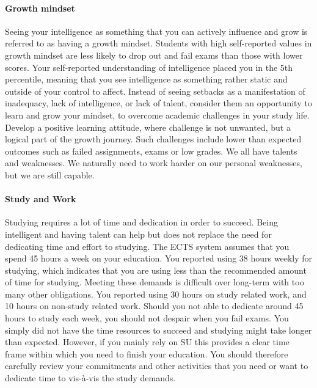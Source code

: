 \documentclass[]{article}
\let\oldparagraph\paragraph
\renewcommand{\paragraph}[1]{\oldparagraph{#1}\mbox{}}
\begin{document}
\paragraph{Growth mindset}\label{growth-mindset}

Seeing your intelligence as something that you can actively influence
and grow is referred to as having a growth mindset. Students with high
self-reported values in growth mindset are less likely to drop out and
fail exams than those with lower scores. Your self-reported
understanding of intelligence placed you in the 5th percentile, meaning
that you see intelligence as something rather static and outside of your
control to affect. Instead of seeing setbacks as a manifestation of
inadequacy, lack of intelligence, or lack of talent, consider them an
opportunity to learn and grow your mindset, to overcome academic
challenges in your study life. Develop a positive learning attitude,
where challenge is not unwanted, but a logical part of the growth
journey. Such challenges include lower than expected outcomes such as
failed assignments, exams or low grades. We all have talents and
weaknesses. We naturally need to work harder on our personal weaknesses,
but we are still capable.

\paragraph{Study and Work}\label{study-and-work}

Studying requires a lot of time and dedication in order to succeed.
Being intelligent and having talent can help but does not replace the
need for dedicating time and effort to studying. The ECTS system assumes
that you spend 45 hours a week on your education. You reported using 38
hours weekly for studying, which indicates that you are using less than
the recommended amount of time for studying. Meeting these demands is
difficult over long-term with too many other obligations. You reported
using 30 hours on study related work, and 10 hours on non-study related
work. Should you not able to dedicate around 45 hours to study each
week, you should not despair when you fail exams. You simply did not
have the time resources to succeed and studying might take longer than
expected. However, if you mainly rely on SU this provides a clear time
frame within which you need to finish your education. You should
therefore carefully review your commitments and other activities that
you need or want to dedicate time to vis-à-vis the study demands.
\end{document}
